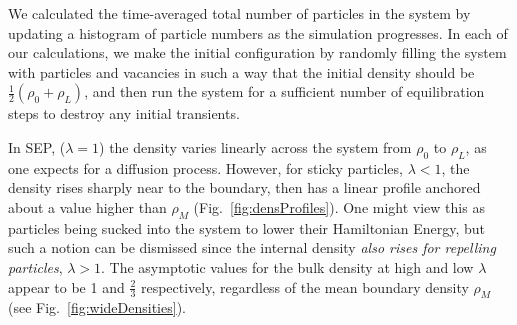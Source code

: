 \documentclass[
reprint, amsmath,amssymb, aps,
 prx,
]{revtex4-1}
\begin{document}
We calculated the time-averaged total number of particles in
the system by updating a histogram of particle numbers
as the simulation progresses. In each of our calculations, we make the
initial configuration by randomly filling the system with particles
and vacancies in such a way that the initial density should be
$\frac{1}{2}(\rho_0 + \rho_L)$, and then run the system for a
sufficient number of equilibration steps to destroy any initial
transients.

In SEP, ($\lambda=1$) the density varies linearly across the system
from $\rho_0$ to $\rho_L$, as one expects for a diffusion process.
However, for sticky particles, $\lambda<1$, the density rises sharply
near to the boundary, then has a linear profile anchored about a value higher
than $\rho_M$  (Fig.~\ref{fig:densProfiles}). 
One might view this as particles being sucked into the
system to lower their Hamiltonian Energy, but such a notion can be
dismissed since the internal density {\it also rises for repelling
  particles}, $\lambda>1$.  The asymptotic values for the bulk density at
high and low $\lambda$ appear to be 1 and $\frac{2}{3}$ respectively, regardless of the 
mean boundary density $\rho_M$ (see Fig.~\ref{fig:wideDensities}). 
\end{document}
